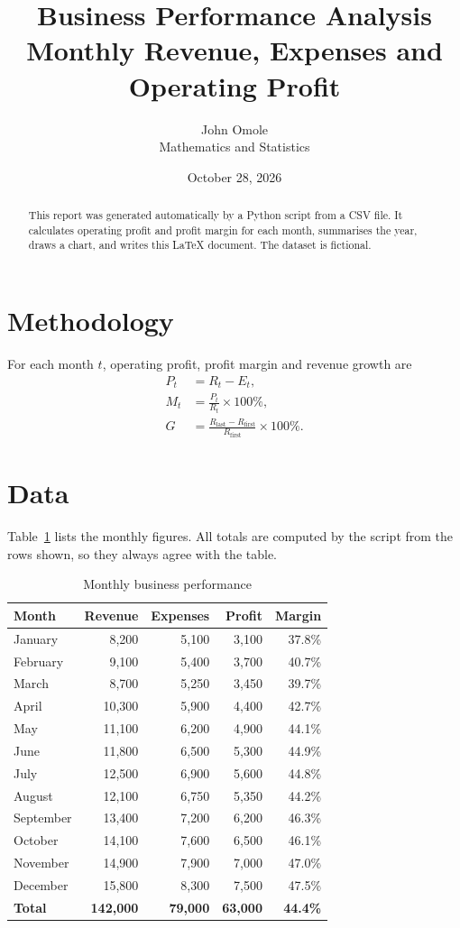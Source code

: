 \documentclass[11pt,a4paper]{article}
\title{Business Performance Analysis\\[2pt]\large Monthly Revenue, Expenses and Operating Profit}
\author{John Omole\\Mathematics and Statistics}
\date{October 28, 2026}
\begin{document}
\maketitle

\begin{abstract}
This report was generated automatically by a Python script from a CSV file.
It calculates operating profit and profit margin for each month, summarises
the year, draws a chart, and writes this \LaTeX{} document. The dataset is fictional.
\end{abstract}

\section{Methodology}
For each month $t$, operating profit, profit margin and revenue growth are
\begin{align}
P_t &= R_t - E_t, \\
M_t &= \frac{P_t}{R_t} \times 100\%, \\
G &= \frac{R_{\text{last}} - R_{\text{first}}}{R_{\text{first}}} \times 100\%.
\end{align}

\section{Data}
Table~\ref{tab:data} lists the monthly figures. All totals are computed by the
script from the rows shown, so they always agree with the table.

\begin{table}[h]
\centering
\caption{Monthly business performance}
\label{tab:data}
\begin{tabular}{lrrrr}
\toprule
Month & Revenue & Expenses & Profit & Margin \\
\midrule
January & 8,200 & 5,100 & 3,100 & 37.8\% \\
February & 9,100 & 5,400 & 3,700 & 40.7\% \\
March & 8,700 & 5,250 & 3,450 & 39.7\% \\
April & 10,300 & 5,900 & 4,400 & 42.7\% \\
May & 11,100 & 6,200 & 4,900 & 44.1\% \\
June & 11,800 & 6,500 & 5,300 & 44.9\% \\
July & 12,500 & 6,900 & 5,600 & 44.8\% \\
August & 12,100 & 6,750 & 5,350 & 44.2\% \\
September & 13,400 & 7,200 & 6,200 & 46.3\% \\
October & 14,100 & 7,600 & 6,500 & 46.1\% \\
November & 14,900 & 7,900 & 7,000 & 47.0\% \\
December & 15,800 & 8,300 & 7,500 & 47.5\% \\
\midrule
\textbf{Total} & \textbf{142,000} & \textbf{79,000} & \textbf{63,000} & \textbf{44.4\%} \\
\bottomrule
\end{tabular}
\end{table}
\end{document}
